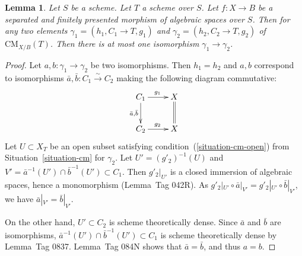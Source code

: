 \documentclass{stacks-project}
\theoremstyle{plain}
\newtheorem{lemma}[subsection]{Lemma}
\theoremstyle{definition}
\theoremstyle{remark}
\numberwithin{equation}{subsection}
\def\CMfunctor{\mathcal{C}\!{\it oh}}
\def\CMfunctor{\text{CM}}
\begin{document}
\begin{lemma}\label{cm-fibered-in-setoids}
Let $S$ be a scheme.
Let $T$ a scheme over $S$.
Let $f \colon X \to B$ be a separated and finitely presented morphism of algebraic spaces over $S$.
Then for any two elements $\gamma_1 = (h_1,C_1 \to T,g_1)$ and $\gamma_2 = (h_2,C_2 \to T,g_2)$ of $\CMfunctor_{X/B}(T)$.
Then there is at most one isomorphism $\gamma_1 \to \gamma_2$.
\end{lemma}
\begin{proof}
Let $a,b \colon \gamma_1 \to \gamma_2$ be two isomorphisms.
Then $h_1 = h_2$ and $a,b$ correspond to isomorphisms $\bar{a},\bar{b} \colon C_1 \xrightarrow{\sim} C_2$ making the following diagram commutative:
\[ \xymatrix{
  C_1 \ar[r]^{g_1} \ar[d]_{\bar{a},\bar{b}} & X \ar@{=}[d] \\
C_2 \ar[r]^{g_2} & X
} \]
Let $U \subset X_T$ be an open subset satisfying condition~(\ref{situation-cm-open}) from Situation~\ref{situation-cm} for $\gamma_2$.
Let $U' = (g'_2)^{-1}(U)$ and $V' = \bar{a}^{-1}(U') \cap \bar{b}^{-1}(U') \subset C_1$.
Then $g'_2|_{U'}$ is a closed immersion of algebraic spaces, hence a monomorphism (Lemma~Tag 042R).
As $g'_2|_{U'} \circ \bar{a}|_{V'} = g'_2|_{U'} \circ \bar{b}|_{V'}$, we have $\bar{a}|_{V'} = \bar{b}|_{V'}$.

On the other hand, $U' \subset C_2$ is scheme theoretically dense.
Since $\bar{a}$ and $\bar{b}$ are isomorphisms, $\bar{a}^{-1}(U') \cap \bar{b}^{-1}(U') \subset C_1$ is scheme theoretically dense by Lemma~Tag 0837.
Lemma~Tag 084N shows that $\bar{a} = \bar{b}$, and thus $a = b$.
\end{proof}
\end{document}

